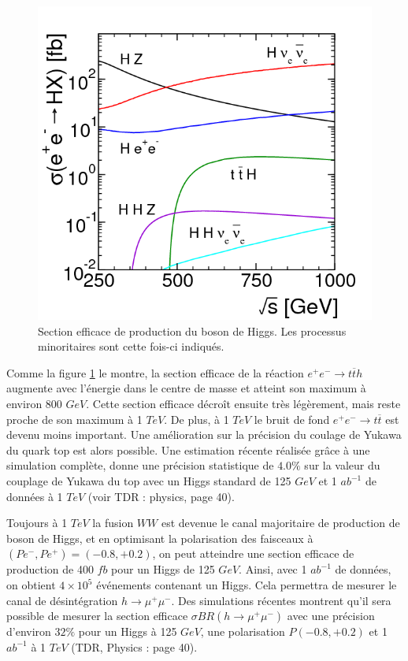   \begin{figure}[!htb]
    \begin{center} 
      \includegraphics[scale=0.40]{./figures/cross_section_prod_Higgs_ILC.png}
      \caption{Section efficace de production du boson de Higgs. Les processus minoritaires sont cette fois-ci indiqu\'es.}
     \label{fig:crossSectionHiggs}
     \end{center}
  \end{figure} 
   
   Comme la figure \ref{fig:crossSectionHiggs} le montre, la section efficace de la r\'eaction $e^+ e^- \rightarrow t \overline{t} h$ augmente avec l'\'energie dans le centre de masse et atteint son maximum \`a environ 800 $GeV$. Cette section efficace d\'ecroît ensuite tr\`es l\'eg\`erement, mais reste proche de son maximum \`a 1 $TeV$. De plus, \`a 1 $TeV$ le bruit de fond $e^+ e^- \rightarrow t\overline{t}$ est devenu moins important. Une am\'elioration sur la pr\'ecision du coulage de Yukawa du quark top est alors possible. Une estimation r\'ecente r\'ealis\'ee grâce \`a une simulation compl\`ete, donne une pr\'ecision statistique de $4.0\%$ sur la valeur du couplage de Yukawa du top avec un Higgs standard de 125 $GeV$ et 1 $ab^{-1}$ de donn\'ees \`a 1 $TeV$ (voir TDR : physics, page 40).
   
   \medskip
   
   Toujours \`a 1 $TeV$ la fusion $WW$ est devenue le canal majoritaire de production de boson de Higgs, et en optimisant la polarisation des faisceaux \`a $(Pe^- , Pe^+ ) =  (-0.8, +0.2)$, on peut atteindre une section efficace de production de 400 $fb$ pour un Higgs de 125 $GeV$. Ainsi, avec 1 $ab^{-1}$ de donn\'ees, on obtient $4 \times 10^5$ \'ev\'enements contenant un Higgs. Cela permettra de mesurer le canal de d\'esint\'egration $h \rightarrow \mu^+ \mu^-$. Des simulations r\'ecentes montrent qu'il sera possible de mesurer la section efficace $\sigma BR(h \rightarrow \mu^+ \mu^-)$ avec une pr\'ecision d'environ $32\%$ pour un Higgs \`a 125 $GeV$, une polarisation $ P(-0.8, +0.2)$ et 1 $ab^{-1}$ \`a 1 $TeV$ (TDR, Physics : page 40).
   
